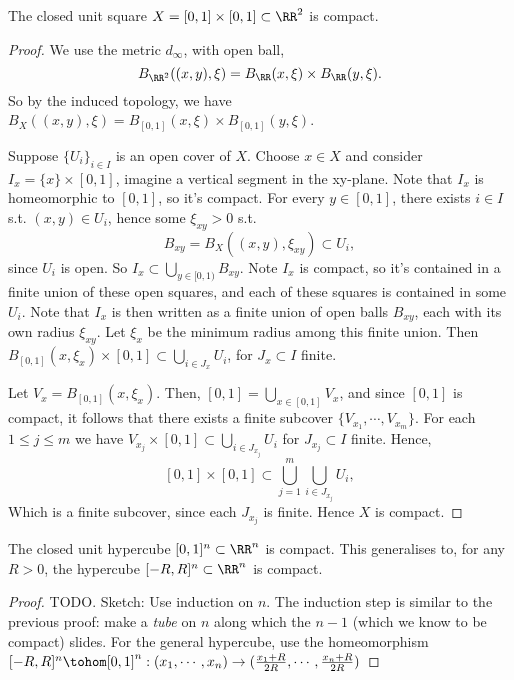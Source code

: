 \begin{proposition}
  The closed unit square $X=[0,1]\times [0,1] \subset \RR^2$ is compact.
  \label{<+label+>}
\end{proposition}
\begin{proof}
  We use the metric $d_{\infty}$, with open ball,
  \[B_{\RR^2}( (x,y), \xi) = B_{\RR}(x,\xi)\times B_{\RR}(y,\xi).\]
  So by the induced topology, we have $B_X( (x,y),\xi)=B_{[0,1]}(x,\xi)\times
  B_{[0,1]}(y,\xi)$.

  Suppose $\{U_i\}_{i\in I}$ is an open cover of $X$. Choose $x\in X$ and
  consider $I_x= \{x\} \times [0,1]$, imagine a vertical segment in the
  xy-plane. Note that $I_x$ is homeomorphic to $[0,1]$, so it's compact. For
  every $y\in [0,1]$, there exists $i\in I$ s.t. $(x,y)\in U_i$, hence some
  $\xi_{xy}>0$ s.t.
  \[B_{xy}= B_{X}( (x,y), \xi_{xy}) \subset U_i,\]
  since $U_i$ is open. So $I_{x} \subset \bigcup_{y\in [0,1)} B_{xy}$. Note
  $I_x$ is compact, so it's contained in a finite union of these open squares,
  and each of these squares is contained in some $U_i$. Note that $I_x$ is then
  written as a finite union of open balls $B_{xy}$, each with its own radius
  $\xi_{xy}$. Let $\xi_x$ be the minimum radius among this finite union. Then
  $B_{[0,1]}(x,\xi_x)\times [0,1]\subset\bigcup_{i\in J_x} U_i$, for $J_x\subset
  I$ finite.

  Let $V_x=B_{[0,1]}(x,\xi_x)$. Then, $[0,1]=\bigcup_{x\in[0,1]}V_x$, and since
  $[0,1]$ is compact, it follows that there exists a finite subcover
  $\{V_{x_1}, \cdots, V_{x_m}\}$. For each $1\leq j\leq m$ we have
  $V_{x_j}\times [0,1] \subset \bigcup_{i\in J_{x_j}}U_i$ for $J_{x_j}\subset I$
  finite. Hence,
  \[ [0,1]\times [0,1] \subset \bigcup_{j=1}^m \bigcup_{i\in J_{x_j}}U_i,\]
  Which is a finite subcover, since each  $J_{x_j}$ is finite. Hence $X$ is
  compact.
\end{proof}

\begin{proposition}
  The closed unit hypercube $[0,1]^n\subset \RR^n$ is compact. This generalises
  to, for any $R>0$, the hypercube $[-R,R]^n\subset \RR^n$ is compact.
  \label{<+label+>}
\end{proposition}
\begin{proof}
  TODO. Sketch:
  Use induction on $n$. The induction step is similar to the previous proof:
  make a \emph{tube} on $n$ along which the $n-1$ (which we know to be compact)
  slides. For the general hypercube, use the homeomorphism
  $[-R,R]^n\tohom[0,1]^n:(x_1,\cdots, x_n)\to (\frac{x_1+R}{2R}, \cdots,
  \frac{x_n+R}{2R})$
\end{proof}

